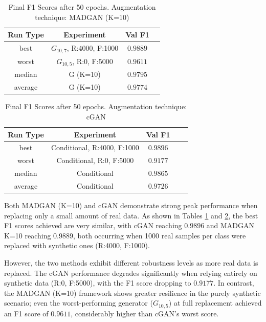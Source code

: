 \begin{table}[H]
	\vspace{-1.5em}
	\centering
	\begin{tabular}{|c|c|c|c|}
		\hline
		Run Type & Experiment & Val F1 \\ \hline
		best & \(G_{10, 7}\), R:4000, F:1000 & $0.9889$\\ \hline
		worst & \(G_{10, 5}\), R:0, F:5000 & $0.9611$\\ \hline
		median & G (K=10) & $0.9795$\\ \hline
		average & G (K=10) & $0.9774$
		\\ \hline
	\end{tabular}
    \caption{Final F1 Scores after 50 epochs. Augmentation technique: MADGAN (K=10)}
        \label{tab:res_replacement_mnist_ccgan_vs_madgan__madgan}
\end{table}
\begin{table}[H]
	\centering
	\vspace{-1.5em}
	\begin{tabular}{|c|c|c|c|c|}
		\hline
		Run Type & Experiment & Val F1 \\ \hline
		best & Conditional, R:4000, F:1000 & $0.9896$\\ \hline
		worst & Conditional, R:0, F:5000 & $0.9177$\\ \hline
		median & Conditional & $0.9865$\\ \hline
		average & Conditional & $0.9726$
		\\ \hline
	\end{tabular}
    \caption{Final F1 Scores after 50 epochs. Augmentation technique: cGAN}
        \label{tab:res_replacement_mnist_ccgan_vs_madgan__cgan}
\end{table}
Both MADGAN (K=10) and cGAN demonstrate strong peak performance when replacing only a small amount of real data. As shown in Tables \ref{tab:res_replacement_mnist_ccgan_vs_madgan__madgan} and \ref{tab:res_replacement_mnist_ccgan_vs_madgan__cgan}, the best F1 scores achieved are very similar, with cGAN reaching $0.9896$ and MADGAN K=10 reaching $0.9889$, both occurring when 1000 real samples per class were replaced with synthetic ones (R:4000, F:1000).

However, the two methods exhibit different robustness levels as more real data is replaced. The cGAN performance degrades significantly when relying entirely on synthetic data (R:0, F:5000), with the F1 score dropping to $0.9177$. In contrast, the MADGAN (K=10) framework shows greater resilience in the purely synthetic scenario; even the worst-performing generator (\(G_{10,5}\)) at full replacement achieved an F1 score of $0.9611$, considerably higher than cGAN's worst score.

